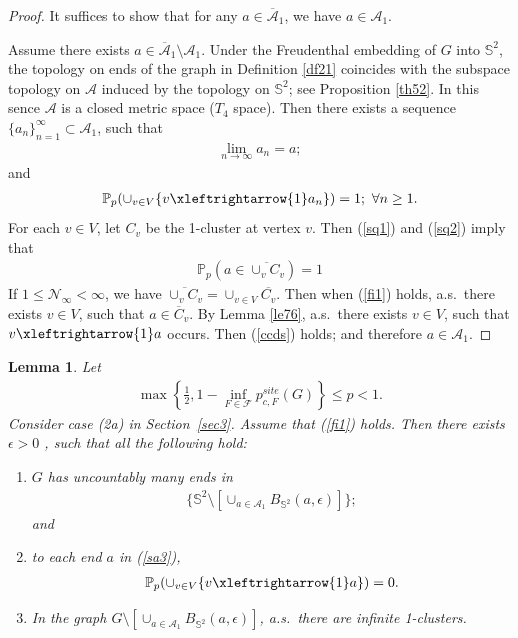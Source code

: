\documentclass[11pt]{amsart}
\theoremstyle{plain}
\newtheorem{lemma}[theorem]{Lemma}
\numberwithin{equation}{section}
\numberwithin{figure}{section}
\newcommand\PP{{\mathbb P}}
\begin{document}
\begin{proof}It suffices to show that for any $a\in \overline{\mathcal{A}}_1$, we have $a\in \mathcal{A}_1$.

Assume there exists $a\in \overline{\mathcal{A}}_1\setminus \mathcal{A}_1$. Under the Freudenthal embedding of $G$ into $\mathbb{S}^2$, the topology on ends of the graph in Definition \ref{df21} coincides with the subspace topology on $\mathcal{A}$ induced by the topology on $\mathbb{S}^2$; see Proposition \ref{th52}. In this sence $\mathcal{A}$ is a closed metric space ($T_4$ space).
Then there exists a sequence $\{a_n\}_{n=1}^{\infty}\subset \mathcal{A}_1$, such that
\begin{align}
\lim_{n\rightarrow\infty}a_n=a;\label{sq1}
\end{align}
and 
\begin{align}
\PP_p(\cup_{v\in V}\{v\xleftrightarrow{1}a_n\})=1;\ \forall n\geq 1.\label{sq2}
\end{align}
For each $v\in V$, let $C_v$ be the 1-cluster at vertex $v$. Then (\ref{sq1}) and (\ref{sq2}) imply that
\begin{align*}
\PP_p(a\in \overline{\cup_v {C_v}})=1
\end{align*}
If $1\leq \mathcal{N}_{\infty}<\infty$, we have $\overline{\cup_v {C_v}}=\cup_{v\in V}\overline{C_v}$. Then when (\ref{fi1}) holds, a.s.~there exists $v\in V$, such that $a\in \overline{C}_v$. By Lemma \ref{le76}, a.s.~there exists $v\in V$, such that $v\xleftrightarrow{1}a$ occurs. Then (\ref{ccds}) holds; and therefore $a\in \mathcal{A}_1$.
\end{proof}

\begin{lemma}\label{lm79}Let 
\begin{align}
\max\left\{\frac{1}{2},1-\inf_{F\in\mathcal{F}}p_{c,F}^{site}(G)\right\}\leq p<1.\label{pdm}
\end{align}
Consider case (2a) in Section~\ref{sec3}.
 Assume that (\ref{fi1}) holds. Then there exists $\epsilon>0$ ,  such that all the following hold:
\begin{enumerate}[label=(\Alph*)]
\item 
$G$ has uncountably many ends in 
\begin{align}
\{\mathbb{S}^2\setminus [\cup_{a\in \mathcal{A}_1}B_{\mathbb{S}^2}(a,\epsilon)]\};\label{sa3}
\end{align}
and 
\item to each end $a$ in (\ref{sa3}), 
\begin{align}
\PP_p(\cup_{v\in V}\{v\xleftrightarrow{1} a\})=0.\label{ccd3}
\end{align}

\item In the graph $G\setminus [\cup_{a\in\mathcal{A}_1}B_{\mathbb{S}^2}(a,\epsilon)]$, a.s.~there are infinite 1-clusters.
\end{enumerate}
\end{lemma}
\end{document}
